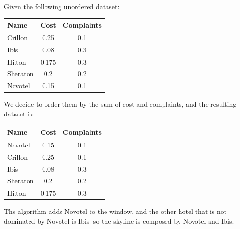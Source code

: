 \documentclass[12pt, a4paper]{report}
\newtheorem[style=M,bodystyle=\normalfont]{theorem}{Theorem}
\newtheorem[style=M,bodystyle=\normalfont]{corollary}{Corollary}
\newtheorem[style=M,bodystyle=\normalfont]{lemma}{Lemma}
\newtheorem[style=M,bodystyle=\normalfont]{definition}{Definition}
\begin{document}
    \begin{example}
        Given the following unordered dataset: 
        \begin{table}[H]
            \centering
            \begin{tabular}{lcc}
            \textbf{Name}                 & \textbf{Cost} & \textbf{Complaints} \\ \hline
            \multicolumn{1}{l|}{Crillon}  & 0.25  & 0.1        \\
            \multicolumn{1}{l|}{Ibis}     & 0.08  & 0.3        \\
            \multicolumn{1}{l|}{Hilton}   & 0.175 & 0.3        \\
            \multicolumn{1}{l|}{Sheraton} & 0.2   & 0.2        \\
            \multicolumn{1}{l|}{Novotel}  & 0.15  & 0.1       
            \end{tabular}
        \end{table}
        We decide to order them by the sum of cost and complaints, and the resulting dataset is: 
        \begin{table}[H]
            \centering
            \begin{tabular}{lcc}
            \textbf{Name}                 & \textbf{Cost} & \textbf{Complaints} \\ \hline
            \multicolumn{1}{l|}{Novotel}  & 0.15          & 0.1                 \\
            \multicolumn{1}{l|}{Crillon}  & 0.25          & 0.1                 \\
            \multicolumn{1}{l|}{Ibis}     & 0.08          & 0.3                 \\
            \multicolumn{1}{l|}{Sheraton} & 0.2           & 0.2                 \\
            \multicolumn{1}{l|}{Hilton}   & 0.175         & 0.3                
            \end{tabular}
        \end{table}
        The algorithm adds Novotel to the window, and the other hotel that is not dominated by Novotel is Ibis, so the skyline is composed by Novotel and Ibis. 
    \end{example}
\end{document}
